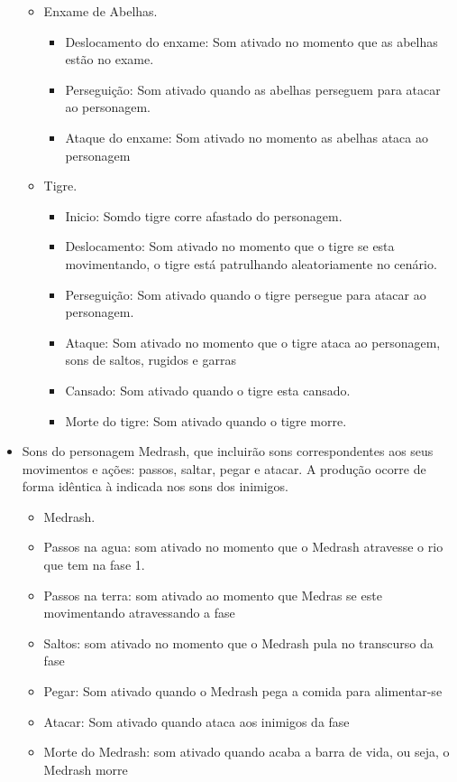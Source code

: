 \begin{itemize}
\begin{itemize}
\item Enxame de Abelhas.
\begin{itemize}
\item Deslocamento do enxame: Som ativado no momento que as abelhas estão 
no exame.
\item Perseguição: Som ativado quando as abelhas perseguem para atacar 
ao personagem.
\item Ataque do enxame: Som ativado no momento as abelhas ataca ao personagem
\end{itemize}

\item Tigre.
\begin{itemize}
\item Inicio: Somdo tigre corre afastado do personagem. 
\item Deslocamento: Som ativado no momento que o tigre se esta movimentando, 
o tigre está patrulhando aleatoriamente no cenário.
\item Perseguição: Som ativado quando o tigre persegue para atacar 
ao personagem.
\item Ataque: Som ativado no momento que o tigre ataca ao personagem, 
sons de saltos, rugidos e garras  
\item Cansado: Som ativado quando o tigre esta cansado.
\item Morte do tigre: Som ativado quando o tigre morre.
\end{itemize}



\end{itemize}

\item Sons do personagem Medrash, que incluirão sons correspondentes
 aos seus movimentos e ações: passos, saltar, pegar e atacar. A
 produção ocorre de forma idêntica à indicada nos sons dos inimigos.

\begin{itemize}
\item Medrash.
\item Passos na agua: som ativado no momento que o Medrash atravesse o rio 
que tem na fase 1. 
\item Passos na terra: som ativado ao momento que Medras se este movimentando 
atravessando a fase 
\item Saltos: som ativado no momento que o Medrash pula no transcurso da fase
\item Pegar: Som ativado quando o Medrash pega a comida para alimentar-se
\item Atacar: Som ativado quando ataca aos inimigos da fase
\item Morte do Medrash: som ativado quando acaba a barra de vida, 
ou seja, o Medrash morre
\end{itemize}


\end{itemize}
